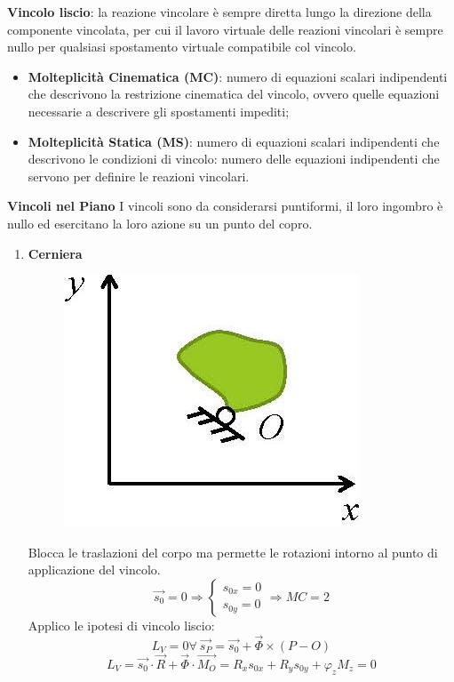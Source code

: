 \documentclass{article}
\begin{document}
\begin{adjustwidth}{2in}{}
\textbf{Vincolo liscio}: la reazione vincolare è sempre diretta lungo la direzione della componente vincolata, per cui il lavoro virtuale delle reazioni vincolari è sempre nullo per qualsiasi spostamento virtuale compatibile col vincolo.

 \begin{itemize}
 	\item \textbf{Molteplicità Cinematica (MC)}:  numero di equazioni scalari indipendenti che descrivono la restrizione cinematica del vincolo, ovvero quelle equazioni necessarie a descrivere gli spostamenti impediti;
 	
 	
 	\item \textbf{Molteplicità Statica (MS)}: numero di equazioni scalari indipendenti che descrivono le condizioni di vincolo: numero delle equazioni indipendenti che servono per definire le reazioni vincolari.
 \end{itemize}

\newpage
{\Large \textbf{Vincoli nel Piano}} \mbox{} \newline
I vincoli sono da considerarsi puntiformi, il loro ingombro è nullo ed esercitano la loro azione su un punto del copro.
\begin{enumerate}
	\item \textbf{Cerniera}\newline
	\begin{figure}[H]
		\centering
		\includegraphics[width=0.25\linewidth]{"immagini/1.PARTE1_Pagina_29"}
	\end{figure}
	Blocca le traslazioni del corpo ma permette le rotazioni intorno al punto di applicazione del vincolo. 
	\[ 
	\vec{s_{0}} = 0 \Rightarrow \begin{cases}
		s_{0x} = 0 \\
		s_{0y} = 0
	\end{cases} \Rightarrow MC = 2
	\]
	Applico le ipotesi di vincolo liscio:
	\[ 
	L_{V} = 0 \forall ~\vec{s_{P}} = \vec{s_{0}} + \vec{\Phi} \times (P-O)
	\]
	\[ 
	L_{V} = \vec{s_{0}} \cdot \vec{R} + \vec{\Phi} \cdot \vec{M_{O}} = R_{x}s_{0x} + R_{y}s_{0y} + \varphi_{z}M_{z} = 0
	\]
	

\end{enumerate}
\end{adjustwidth}
\end{document}
